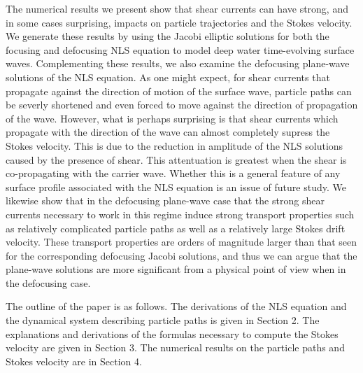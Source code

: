 \documentclass[a4paper,11pt]{article}
\begin{document}
The numerical results we present show that shear currents can have strong, and in some cases surprising, impacts on particle trajectories and the Stokes velocity.  We generate these results by using the Jacobi elliptic solutions for both the focusing and defocusing NLS equation to model deep water time-evolving surface waves.  Complementing these results, we also examine the defocusing plane-wave solutions of the NLS equation.  As one might expect, for shear currents that propagate against the direction of motion of the surface wave, particle paths can be severly shortened and even forced to move against the direction of propagation of the wave.  However, what is perhaps surprising is that shear currents which propagate with the direction of the wave can almost completely supress the Stokes velocity.  This is due to the reduction in amplitude of the NLS solutions caused by the presence of shear.  This attentuation is greatest when the shear is co-propagating with the carrier wave.  Whether this is a general feature of any surface profile associated with the NLS equation is an issue of future study.    We likewise show that in the defocusing plane-wave case that the strong shear currents necessary to work in this regime induce strong transport properties such as relatively complicated particle paths as well as a relatively large Stokes drift velocity.  These transport properties are orders of magnitude larger than that seen for the corresponding defocusing Jacobi solutions, and thus we can argue that the plane-wave solutions are more significant from a physical point of view when in the defocusing case.  


The outline of the paper is as follows.  The derivations of the NLS equation and the dynamical system describing particle paths is given in Section 2.  The explanations and derivations of the formulas necessary to compute the Stokes velocity are given in Section 3.  The numerical results on the particle paths and Stokes velocity are in Section 4. 
\end{document}
